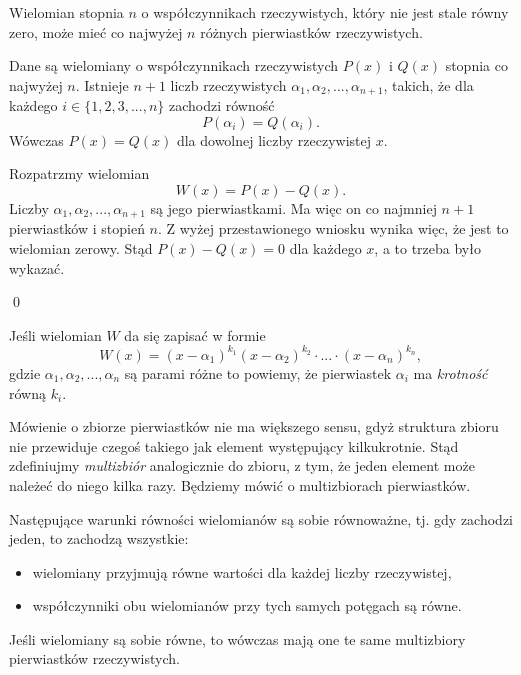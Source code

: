 \vspace{5px}


\noindent
Wielomian stopnia $n$ o współczynnikach rzeczywistych, który nie jest stale równy zero, może mieć co najwyżej $n$ różnych pierwiastków rzeczywistych.


\vspace{5px} 



\noindent
Dane są wielomiany o współczynnikach rzeczywistych $P(x)$ i $Q(x)$ stopnia co najwyżej $n$. Istnieje $n + 1$ liczb rzeczywistych $\alpha_1, \alpha_2, ..., \alpha_{n + 1}$, takich, że dla każdego $i \in \{1, 2, 3, ..., n\}$ zachodzi równość 
\[
    P(\alpha_i) = Q(\alpha_i).
\]
Wówczas $P(x) = Q(x)$ dla dowolnej liczby rzeczywistej $x$.

\vspace{5px}


\noindent
Rozpatrzmy wielomian 
\[
    W(x) = P(x) - Q(x).
\]
Liczby $\alpha_1, \alpha_2, ..., \alpha_{n + 1}$ są jego pierwiastkami. Ma więc on co najmniej $n + 1$ pierwiastków i stopień $n$. Z wyżej przestawionego wniosku wynika więc, że jest to wielomian zerowy. Stąd $P(x) - Q(x) = 0$ dla każdego $x$, a to trzeba było wykazać.

\qed


\noindent
Jeśli wielomian $W$ da się zapisać w formie
\[
    W(x) = (x - \alpha_1)^{k_1}(x - \alpha_2)^{k_2} \cdot ... \cdot (x - \alpha_n)^{k_n},
\]
gdzie $\alpha_1, \alpha_2, ..., \alpha_{n}$ są parami różne to powiemy, że pierwiastek $\alpha_i$ ma \textit{krotność} równą $k_i$. 

\vspace{10px}
\noindent
Mówienie o zbiorze pierwiastków nie ma większego sensu, gdyż struktura zbioru nie przewiduje czegoś takiego jak element występujący kilkukrotnie. Stąd zdefiniujmy \textit{multizbiór} analogicznie do zbioru, z tym, że jeden element może należeć do niego kilka razy. Będziemy mówić o multizbiorach pierwiastków.

\vspace{5px}


\noindent
Następujące warunki równości wielomianów są sobie równoważne, tj. gdy zachodzi jeden, to zachodzą wszystkie:
\begin{itemize}
    \item wielomiany przyjmują równe wartości dla każdej liczby rzeczywistej,
    \item współczynniki obu wielomianów przy tych samych potęgach są równe.
\end{itemize}
Jeśli wielomiany są sobie równe, to wówczas mają one te same multizbiory pierwiastków rzeczywistych.

